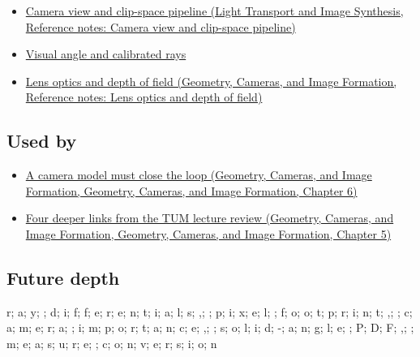 \begin{itemize}
\tightlist
\item
  \href{../04-Light-Transport-and-Image-Synthesis/main.pdf\#nameddest=appendix-1c07d64f5e70}{Camera view and clip-space pipeline (Light Transport and Image Synthesis, Reference notes: Camera view and clip-space pipeline)}
\item
  \hyperref[appendix-7d356c396d1a]{Visual angle and calibrated rays}
\item
  \href{../03-Geometry-Cameras-and-Image-Formation/main.pdf\#nameddest=appendix-21f8456e2629}{Lens optics and depth of field (Geometry, Cameras, and Image Formation, Reference notes: Lens optics and depth of field)}
\end{itemize}

\subsection{Used by}\label{appendix-8c40fad29462-used-by}

\begin{itemize}
\tightlist
\item
  \href{../03-Geometry-Cameras-and-Image-Formation/main.pdf\#nameddest=02-foundations-ii-ch037-a-camera-model-must-close-the-loop}{A camera model must close the loop (Geometry, Cameras, and Image Formation, Geometry, Cameras, and Image Formation, Chapter 6)}
\item
  \href{../03-Geometry-Cameras-and-Image-Formation/main.pdf\#nameddest=02-foundations-ii-ch036-four-deeper-links-from-the-tum-lecture-review}{Four deeper links from the TUM lecture review (Geometry, Cameras, and Image Formation, Geometry, Cameras, and Image Formation, Chapter 5)}
\end{itemize}

\subsection{Future depth}\label{appendix-8c40fad29462-future-depth}

r; a; y; ; d; i; f; f; e; r; e; n; t; i; a; l; s; ,; ; p; i; x; e; l; ; f; o; o; t; p; r; i; n; t; ,; ; c; a; m; e; r; a; ; i; m; p; o; r; t; a; n; c; e; ,; ; s; o; l; i; d; -; a; n; g; l; e; ; P; D; F; ,; ; m; e; a; s; u; r; e; ; c; o; n; v; e; r; s; i; o; n
